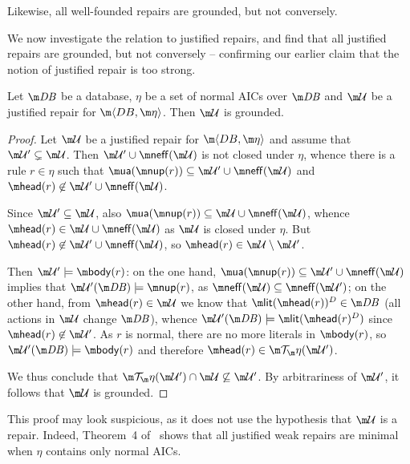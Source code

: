 Likewise, all well-founded repairs are grounded, but not conversely.

We now investigate the relation to justified repairs, and find that all justified repairs are grounded, but not conversely -- confirming our earlier claim that the notion of justified repair is too strong.

\begin{lemma}
  \label{lem:justified}
  Let $\db$ be a database, $\eta$ be a set of normal AICs over $\db$ and $\UU$ be a justified repair for $\fulldb$.
  Then $\UU$ is grounded.
\end{lemma}
\begin{proof}
  Let $\UU$ be a justified repair for $\fulldb$ and assume that $\UU'\subsetneq\UU$.
  Then $\UU'\cup\neff(\UU)$ is not closed under $\eta$, whence there is a rule $r\in\eta$ such that $\actof(\nup(r))\subseteq\UU'\cup\neff(\UU)$ and $\head(r)\not\in\UU'\cup\neff(\UU)$.

  Since $\UU'\subseteq\UU$, also $\actof(\nup(r))\subseteq\UU\cup\neff(\UU)$, whence $\head(r)\in\UU\cup\neff(\UU)$ as $\UU$ is closed under $\eta$.
  But $\head(r)\not\in\UU'\cup\neff(\UU)$, so $\head(r)\in\UU\setminus\UU'$.

  Then $\UU'\models\body(r)$: on the one hand, $\actof(\nup(r))\subseteq\UU'\cup\neff(\UU)$ implies that $\UU'(\db)\models\nup(r)$, as $\neff(\UU)\subseteq\neff(\UU')$; on the other hand, from $\head(r)\in\UU$ we know that $\litof(\head(r))^D\in\db$ (all actions in $\UU$ change $\db$), whence $\UU'(\db)\models\litof(\head(r)^D)$ since $\head(r)\not\in\UU'$.
  As $r$ is normal, there are no more literals in $\body(r)$, so $\UU'(\db)\models\body(r)$ and therefore $\head(r)\in\Op(\UU')$.

  We thus conclude that $\Op(\UU')\cap\UU\not\subseteq\UU'$.
  By arbitrariness of $\UU'$, it follows that $\UU$ is grounded.
\end{proof}
This proof may look suspicious, as it does not use the hypothesis that $\UU$ is a repair.
Indeed, Theorem~4 of~\cite{Caroprese2011} shows that all justified weak repairs are minimal when $\eta$ contains only normal AICs.

